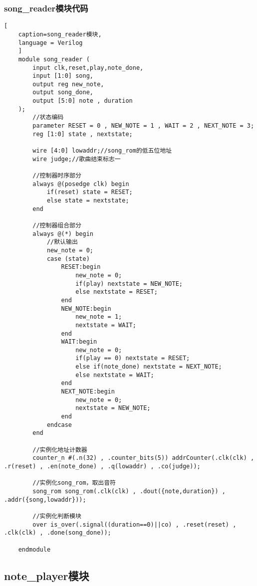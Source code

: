 \documentclass{../source/zjureport}
\begin{document}
            \subsubsection{song_reader模块代码}
\begin{lstlisting}[
    caption=song_reader模块,
    language = Verilog
    ]
    module song_reader (
        input clk,reset,play,note_done,
        input [1:0] song,
        output reg new_note,
        output song_done,
        output [5:0] note , duration
    );
        //状态编码
        parameter RESET = 0 , NEW_NOTE = 1 , WAIT = 2 , NEXT_NOTE = 3;
        reg [1:0] state , nextstate;
    
        wire [4:0] lowaddr;//song_rom的低五位地址
        wire judge;//歌曲结束标志一
        
        //控制器时序部分
        always @(posedge clk) begin
            if(reset) state = RESET;
            else state = nextstate;
        end
    
        //控制器组合部分
        always @(*) begin
            //默认输出
            new_note = 0;
            case (state)
                RESET:begin
                    new_note = 0;
                    if(play) nextstate = NEW_NOTE;
                    else nextstate = RESET;
                end
                NEW_NOTE:begin
                    new_note = 1;
                    nextstate = WAIT;
                end  
                WAIT:begin
                    new_note = 0;
                    if(play == 0) nextstate = RESET;
                    else if(note_done) nextstate = NEXT_NOTE;
                    else nextstate = WAIT;
                end
                NEXT_NOTE:begin
                    new_note = 0;
                    nextstate = NEW_NOTE;
                end
            endcase
        end
    
        //实例化地址计数器
        counter_n #(.n(32) , .counter_bits(5)) addrCounter(.clk(clk) , .r(reset) , .en(note_done) , .q(lowaddr) , .co(judge));
        
        //实例化song_rom，取出音符
        song_rom song_rom(.clk(clk) , .dout({note,duration}) , .addr({song,lowaddr}));
    
        //实例化判断模块
        over is_over(.signal((duration==0)||co) , .reset(reset) , .clk(clk) , .done(song_done));
    
    endmodule
\end{lstlisting}

    \subsection{note_player模块}
\end{document}
